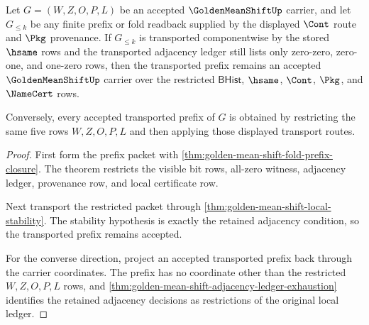 \begin{theorem}
\label{thm:golden-mean-shift-prefix-transport-scope}
Let $G=(W,Z,O,P,L)$ be an accepted $\GoldenMeanShiftUp$ carrier, and let $G_{\leq k}$ be any finite prefix or fold readback supplied by the displayed $\Cont$ route and $\Pkg$ provenance. If $G_{\leq k}$ is transported componentwise by the stored $\hsame$ rows and the transported adjacency ledger still lists only zero-zero, zero-one, and one-zero rows, then the transported prefix remains an accepted $\GoldenMeanShiftUp$ carrier over the restricted $\mathsf{BHist}$, $\hsame$, $\Cont$, $\Pkg$, and $\NameCert$ rows.

Conversely, every accepted transported prefix of $G$ is obtained by restricting the same five rows $W,Z,O,P,L$ and then applying those displayed transport routes.
\end{theorem}
\begin{proof}
First form the prefix packet with \autoref{thm:golden-mean-shift-fold-prefix-closure}. The theorem restricts the visible bit rows, all-zero witness, adjacency ledger, provenance row, and local certificate row.

Next transport the restricted packet through \autoref{thm:golden-mean-shift-local-stability}. The stability hypothesis is exactly the retained adjacency condition, so the transported prefix remains accepted.

For the converse direction, project an accepted transported prefix back through the carrier coordinates. The prefix has no coordinate other than the restricted $W,Z,O,P,L$ rows, and \autoref{thm:golden-mean-shift-adjacency-ledger-exhaustion} identifies the retained adjacency decisions as restrictions of the original local ledger.
\end{proof}

